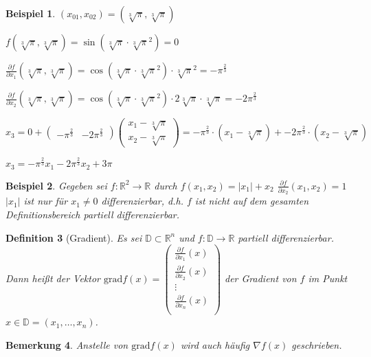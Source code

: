 \documentclass[12pt,a4paper]{scrreprt}
\newtheorem{defi}{Definition}[section]
\newtheorem{bemerkung}[defi]{Bemerkung}
\newtheorem{beispiel}[defi]{Beispiel}
\begin{document}
\begin{beispiel}
	
	$(x_{01},x_{02}) = (\sqrt[3]{\pi},\sqrt[3]{\pi})$
	
	$f(\sqrt[3]{\pi},\sqrt[3]{\pi})=\sin(\sqrt[3]{\pi}\cdot \sqrt[3]{\pi}^2) = 0$
	
	$\frac{\partial f}{\partial x_1}(\sqrt[3]{\pi},\sqrt[3]{\pi})=\cos(\sqrt[3]{\pi}\cdot \sqrt[3]{\pi}^2)\cdot \sqrt[3]{\pi}^2 = -\pi^{\frac{2}{3}}$
	
	$\frac{\partial f}{\partial x_2}(\sqrt[3]{\pi},\sqrt[3]{\pi})=\cos(\sqrt[3]{\pi}\cdot \sqrt[3]{\pi}^2)\cdot 2\sqrt[3]{\pi} \cdot \sqrt[3]{\pi} = -2\pi^{\frac{2}{3}}$
	
	$x_3 = 0 + \begin{pmatrix}-\pi^{\frac{2}{3}} & -2\pi^{\frac{2}{3}}\end{pmatrix} \begin{pmatrix}x_1 - \sqrt[3]{\pi} \\ x_2 - \sqrt[3]{\pi}\end{pmatrix} = -\pi^{\frac{2}{3}} \cdot (x_1 - \sqrt[3]{\pi}) + -2\pi^{\frac{2}{3}} \cdot (x_2 - \sqrt[3]{\pi})$
	
	$x_3 = -\pi^{\frac{2}{3}}x_1 - 2\pi^{\frac{2}{3}}x_2 + 3\pi$
\end{beispiel}

\begin{beispiel}
	Gegeben sei $f:\mathbb{R}^2\to\mathbb{R}$ durch $f(x_1,x_2)=\left| x_1 \right| + x_2$
	$\frac{\partial f}{\partial x_2}(x_1,x_2)=1$
	$\left| x_1 \right|$ ist nur für $x_1 \neq 0$ differenzierbar, d.h. $f$ ist nicht auf dem gesamten Definitionsbereich partiell differenzierbar.
\end{beispiel}

\begin{defi}[Gradient]
	Es sei $\mathbb{D} \subset \mathbb{R}^n$ und $f:\mathbb{D} \to \mathbb{R}$ partiell differenzierbar. Dann heißt der Vektor $\mathrm{grad} f(x) = \begin{pmatrix}
	\frac{\partial f}{\partial x_1}(x) \\
	\frac{\partial f}{\partial x_2}(x) \\
	\vdots \\
	\frac{\partial f}{\partial x_n}(x) \\
	\end{pmatrix}$ der Gradient von $f$ im Punkt $x\in\mathbb{D}=(x_1,\dots,x_n)$.
\end{defi}

\begin{bemerkung}
	Anstelle von $\mathrm{grad} f(x)$ wird auch häufig $\nabla f(x)$ geschrieben.
\end{bemerkung}
\end{document}
